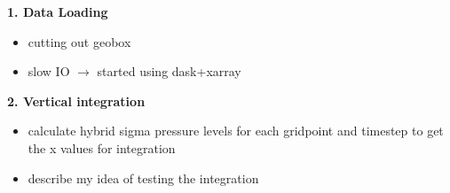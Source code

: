 \textbf{1. Data Loading}

\begin{itemize}
  \item cutting out geobox
  \item slow IO $\rightarrow$ started using dask+xarray 
\end{itemize}

\textbf{2. Vertical integration}

\begin{itemize}
  \item calculate hybrid  sigma pressure levels for each gridpoint and timestep to get the x values for integration
  \item describe my idea of testing the integration
  
\end{itemize}


%
%
%
%     
%
